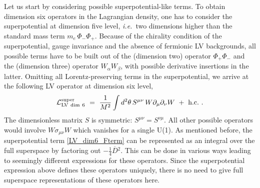 \documentclass[12pt]{revtex4}
\begin{document}
Let us start by considering possible superpotential-like terms. 
To obtain dimension six operators in the Lagrangian density, 
one has to consider the superpotential at dimension five level, 
{\em i.e.}\ two dimensions higher than the standard mass term $m_e\,
\Phi_-\Phi_+$. Because of the chirality condition  of the
superpotential, gauge invariance and the absence of 
fermionic LV backgrounds,  all possible terms have to be built out of the
(dimension two) operator $\Phi_+ \Phi_-$ and the (dimension three)
operator $W_\alpha W_\beta$, with possible derivative insertions in  
the latter. Omitting all Lorentz-preserving terms in the
superpotential, we arrive at the following LV operator at
dimension six level,  
%
\begin{gather} 
{\cal L}_{\rm{LV\ dim\ 6}}^{\rm{super}} ~=~ \frac{1}{M^2}
\int d^2 \theta \, 
S^{\mu\nu}\, W \partial_\mu \partial_\nu W 
~+~ \text{h.c.}~. 
\label{LV_dim6_Fterm}
\end{gather}
%
The dimensionless matrix $S$ is symmetric: 
$S^{\mu\nu} =S^{\nu\mu}$. 
All other possible operators would involve $W \sigma_{\mu\nu} W$ 
which vanishes for a single U(1). 
%
%
As mentioned before, the superpotential term \eqref{LV_dim6_Fterm} 
can be represented as an 
integral over the full superspace by factoring out $-\frac 14
\overline{D}{}^2$. This can be done in various ways leading to
seemingly different expressions for these operators. Since the
superpotential expression above defines these operators uniquely,
there is no need to give full superspace representations of 
these operators here. 
\end{document}
